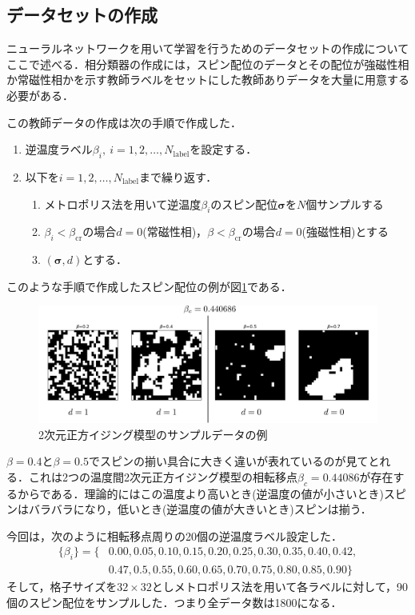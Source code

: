 \documentclass[a4paper,11pt]{jsreport}
\begin{document}
\subsection{データセットの作成}
ニューラルネットワークを用いて学習を行うためのデータセットの作成についてここで述べる．相分類器の作成には，スピン配位のデータとその配位が強磁性相か常磁性相かを示す教師ラベルをセットにした教師ありデータを大量に用意する必要がある．\par
この教師データの作成は次の手順で作成した．
\begin{enumerate}
  \item 逆温度ラベル$\beta_i, \ i=1,2,\dots,N_{\text{label}}$を設定する．
  \item 以下を$i=1,2,\dots,N_{\text{label}}$まで繰り返す．
  \begin{enumerate}
    \item メトロポリス法を用いて逆温度$\beta_i$のスピン配位$\bm{\sigma}$を$N$個サンプルする
    \item $\beta_i<\beta_{\text{cr}}$の場合$d=0$(常磁性相)，$\beta<\beta_{\text{cr}}$の場合$d=0$(強磁性相)とする
    \item $(\bm{\sigma},d)$とする．
  \end{enumerate}
\end{enumerate}
このような手順で作成したスピン配位の例が図\ref{相の分類器データセット}である．
\begin{figure}[H]
   \begin{center}
       \includegraphics[width=\linewidth]{image/配位ラベルと相転移ラベル.png}
       \caption{2次元正方イジング模型のサンプルデータの例}
       \label{相の分類器データセット}
   \end{center}
\end{figure}
$\beta=0.4$と$\beta=0.5$でスピンの揃い具合に大きく違いが表れているのが見てとれる．これは2つの温度間2次元正方イジング模型の相転移点$\beta_c = 0.44086$が存在するからである．理論的にはこの温度より高いとき(逆温度の値が小さいとき)スピンはバラバラになり，低いとき(逆温度の値が大きいとき)スピンは揃う．\par
今回は，次のように相転移点周りの20個の逆温度ラベル設定した．
\begin{align*}
  \{\beta_i\} 
  = \{ &0.00,0.05,0.10,0.15,0.20,0.25,0.30,0.35,0.40,0.42,\\
  &0.47,0.5,0.55,0.60,0.65,0.70,0.75,0.80,0.85,0.90 \}
\end{align*}
そして，格子サイズを$32 \times 32$としメトロポリス法を用いて各ラベルに対して，90個のスピン配位をサンプルした．つまり全データ数は1800になる．\par
\end{document}
